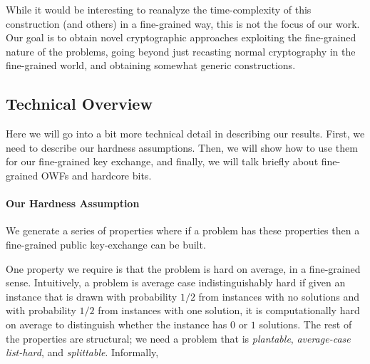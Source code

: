 While it would be interesting to reanalyze the time-complexity of this construction (and others) in a fine-grained way, this is not the focus of our work. Our goal is to obtain novel cryptographic approaches exploiting the fine-grained nature of the problems, going beyond just recasting normal cryptography in the fine-grained world, and obtaining somewhat generic constructions.


\subsection{Technical Overview}
Here we will go into a bit more technical detail in describing our results. First, we need to describe our hardness assumptions. Then, we will show how to use them for our fine-grained key exchange, and finally, we will talk briefly about fine-grained OWFs and hardcore bits.

\paragraph{Our Hardness Assumption} %

We generate a series of properties where if a problem has these properties then a fine-grained public key-exchange can be built.

One property we require is that the problem is hard on average, in a fine-grained sense. Intuitively, a problem is average case indistinguishably hard if given an instance that is drawn with probability $1/2$ from instances with no solutions and with probability $1/2$ from instances with one solution, it is computationally hard on average to distinguish whether the instance has $0$ or $1$ solutions.
The rest of the properties are structural; we need a problem that is \emph{plantable}, \emph{average-case list-hard}, and \emph{splittable}. Informally,

